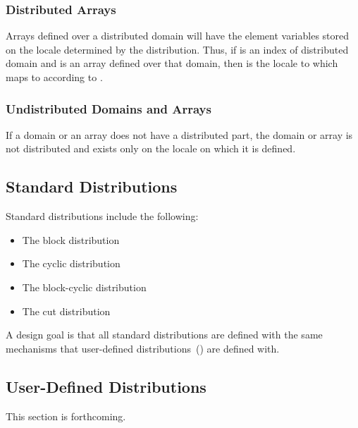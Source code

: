 \subsubsection{Distributed Arrays}
\label{Distributed_Arrays}

Arrays defined over a distributed domain will have the element
variables stored on the locale determined by the distribution.  Thus,
if  is an index of distributed domain  and  is
an array defined over that domain, then  is the
locale to which  maps to according to .

\subsubsection{Undistributed Domains and Arrays}
\label{Undistributed_Domains_and_Arrays}

If a domain or an array does not have a distributed part, the domain
or array is not distributed and exists only on the locale on which it
is defined.

\subsection{Standard Distributions}
\label{Standard_Distributions}

Standard distributions include the following:
\begin{itemize}
\item The block distribution 
\item The cyclic distribution 
\item The block-cyclic distribution 
\item The cut distribution 
\end{itemize}

A design goal is that all standard distributions are defined with the
same mechanisms that user-defined
distributions~() are defined with.

\subsection{User-Defined Distributions}
\label{User_Defined_Distributions}

This section is forthcoming.
